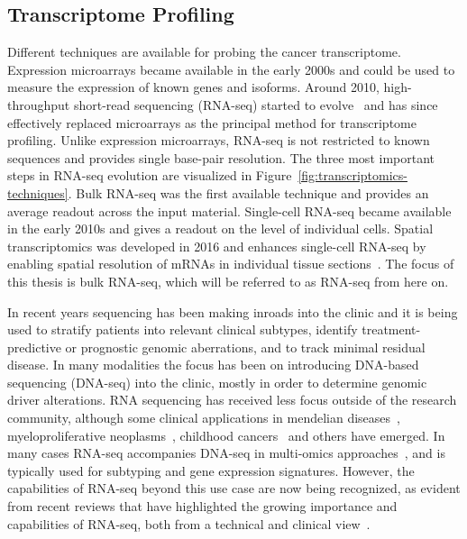 \documentclass[11pt]{book}
\begin{document}
\subsection{Transcriptome Profiling}
\label{subsec:rnaseq}

Different techniques are available for probing the cancer transcriptome. Expression microarrays became available in the early 2000s and could be used to measure the expression of known genes and isoforms. Around 2010, high-throughput short-read sequencing (RNA-seq) started to evolve~\cite{Wang:2009} and has since effectively replaced microarrays as the principal method for transcriptome profiling. Unlike expression microarrays, RNA-seq is not restricted to known sequences and provides single base-pair resolution. The three most important steps in RNA-seq evolution are visualized in Figure~\ref{fig:transcriptomics-techniques}. Bulk RNA-seq was the first available technique and provides an average readout across the input material. Single-cell RNA-seq became available in the early 2010s and gives a readout on the level of individual cells. Spatial transcriptomics was developed in 2016 and enhances single-cell RNA-seq by enabling spatial resolution of mRNAs in individual tissue sections~\cite{Stahl:2016}. The focus of this thesis is bulk RNA-seq, which will be referred to as RNA-seq from here on.

In recent years sequencing has been making inroads into the clinic and it is being used to stratify patients into relevant clinical subtypes, identify treatment-predictive or prognostic genomic aberrations, and to track minimal residual disease. In many modalities the focus has been on introducing DNA-based sequencing (DNA-seq) into the clinic, mostly in order to determine genomic driver alterations. RNA sequencing has received less focus outside of the research community, although some clinical applications in mendelian diseases~\cite{Gonorazky:2019, Murdock:2020, Lee:2020}, myeloproliferative neoplasms~\cite{Schischlik:2019}, childhood cancers~\cite{Wong:2020} and others have emerged. In many cases RNA-seq accompanies DNA-seq in multi-omics approaches~\cite{Roychowdhury:2011}, and is typically used for subtyping and gene expression signatures. However, the capabilities of RNA-seq beyond this use case are now being recognized, as evident from recent reviews that have highlighted the growing importance and capabilities of RNA-seq, both from a technical and clinical view~\cite{Byron:2016, CieslikChinnaiyan:2017, Stark:2019, Marco-Puche:2019}.
\end{document}
